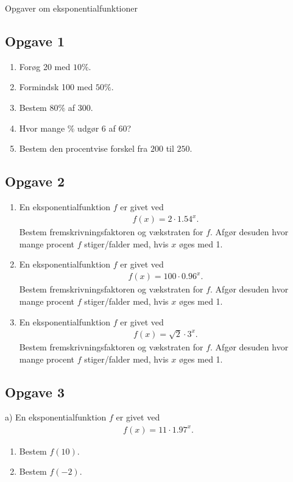 \begin{center}
\Huge
Opgaver om eksponentialfunktioner
\end{center}

\subsection*{Opgave 1}

\begin{enumerate}[label=\roman*)]
	\item Forøg 20 med $10\%$.
	\item Formindsk 100 med $50\%$.
	\item Bestem $80\%$ af 300.
	\item Hvor mange $\% $ udgør 6 af 60?
	\item Bestem den procentvise forskel fra $200$ til $250$.
\end{enumerate}

\subsection*{Opgave 2}

\begin{enumerate}[label=\roman*)]
	\item En eksponentialfunktion $f$ er givet ved
	\begin{align*}
		f(x) = 2\cdot 1.54^x.
	\end{align*}
	Bestem fremskrivningsfaktoren og vækstraten for $f$. Afgør desuden hvor mange procent $f$ stiger/falder med, hvis $x$ øges med 1.
	\item En eksponentialfunktion $f$ er givet ved
	\begin{align*}
		f(x) = 100\cdot 0.96^x.
	\end{align*}
	Bestem fremskrivningsfaktoren og vækstraten for $f$. Afgør desuden hvor mange procent $f$ stiger/falder med, hvis $x$ øges med 1.
	\item En eksponentialfunktion $f$ er givet ved
	\begin{align*}
		f(x) = \sqrt{2}\cdot 3^x.
	\end{align*}
	Bestem fremskrivningsfaktoren og vækstraten for $f$. Afgør desuden hvor mange procent $f$ stiger/falder med, hvis $x$ øges med 1.
\end{enumerate}


\subsection*{Opgave 3}
a) En eksponentialfunktion $f$ er givet ved
\begin{align*}
	f(x) = 11\cdot 1.97^x.
\end{align*}
\begin{enumerate}[label=\roman*)]
	\item Bestem $f(10)$.
	\item Bestem $f(-2)$.
\end{enumerate}

